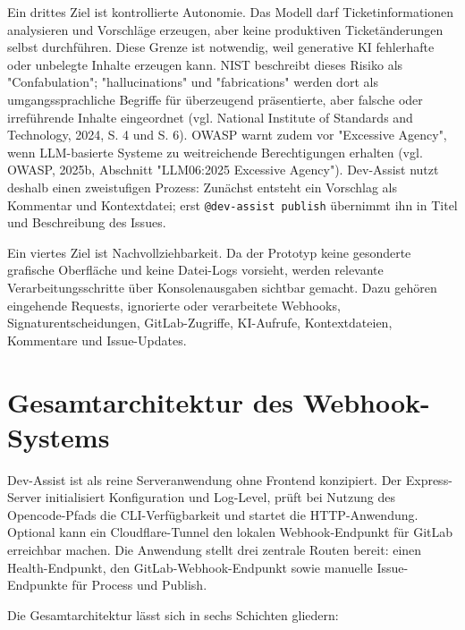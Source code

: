 \documentclass[12pt,a4paper,oneside]{scrreprt}
\begin{document}
Ein drittes Ziel ist kontrollierte Autonomie. Das Modell darf Ticketinformationen analysieren und Vorschläge erzeugen, aber keine produktiven Ticketänderungen selbst durchführen. Diese Grenze ist notwendig, weil generative KI fehlerhafte oder unbelegte Inhalte erzeugen kann. NIST beschreibt dieses Risiko als "Confabulation"; "hallucinations" und "fabrications" werden dort als umgangssprachliche Begriffe für überzeugend präsentierte, aber falsche oder irreführende Inhalte eingeordnet (vgl. National Institute of Standards and Technology, 2024, S. 4 und S. 6). OWASP warnt zudem vor "Excessive Agency", wenn LLM-basierte Systeme zu weitreichende Berechtigungen erhalten (vgl. OWASP, 2025b, Abschnitt "LLM06:2025 Excessive Agency"). Dev-Assist nutzt deshalb einen zweistufigen Prozess: Zunächst entsteht ein Vorschlag als Kommentar und Kontextdatei; erst \texttt{@dev-assist publish} übernimmt ihn in Titel und Beschreibung des Issues.

Ein viertes Ziel ist Nachvollziehbarkeit. Da der Prototyp keine gesonderte grafische Oberfläche und keine Datei-Logs vorsieht, werden relevante Verarbeitungsschritte über Konsolenausgaben sichtbar gemacht. Dazu gehören eingehende Requests, ignorierte oder verarbeitete Webhooks, Signaturentscheidungen, GitLab-Zugriffe, KI-Aufrufe, Kontextdateien, Kommentare und Issue-Updates.

\section{Gesamtarchitektur des Webhook-Systems}

Dev-Assist ist als reine Serveranwendung ohne Frontend konzipiert. Der Express-Server initialisiert Konfiguration und Log-Level, prüft bei Nutzung des Opencode-Pfads die CLI-Verfügbarkeit und startet die HTTP-Anwendung. Optional kann ein Cloudflare-Tunnel den lokalen Webhook-Endpunkt für GitLab erreichbar machen. Die Anwendung stellt drei zentrale Routen bereit: einen Health-Endpunkt, den GitLab-Webhook-Endpunkt sowie manuelle Issue-Endpunkte für Process und Publish.

Die Gesamtarchitektur lässt sich in sechs Schichten gliedern:
\end{document}
